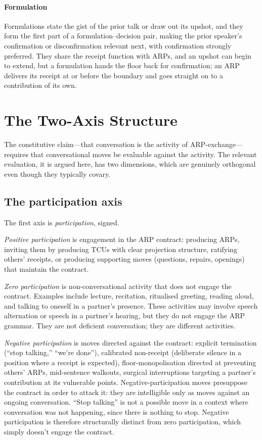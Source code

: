 \paragraph{Formulation} Formulations \citep{HeritageWatson1979} state the gist of the prior talk or draw out its upshot, and they form the first part of a formulation--decision pair, making the prior speaker's confirmation or disconfirmation relevant next, with confirmation strongly preferred. They share the receipt function with ARPs, and an upshot can begin to extend, but a formulation hands the floor back for confirmation; an ARP delivers its receipt at or before the boundary and goes straight on to a contribution of its own.

\section{The Two-Axis Structure}\label{sec:plane}

The constitutive claim---that conversation is the activity of ARP-exchange---requires that conversational moves be evaluable against the activity. The relevant evaluation, it is argued here, has two dimensions, which are genuinely orthogonal even though they typically covary.

\subsection{The participation axis}

The first axis is \emph{participation}, signed.

\emph{Positive participation} is engagement in the ARP contract: producing ARPs, inviting them by producing TCUs with clear projection structure, ratifying others' receipts, or producing supporting moves (questions, repairs, openings) that maintain the contract.

\emph{Zero participation} is non-conversational activity that does not engage the contract. Examples include lecture, recitation, ritualised greeting, reading aloud, and talking to oneself in a partner's presence. These activities may involve speech alternation or speech in a partner's hearing, but they do not engage the ARP grammar. They are not deficient conversation; they are different activities.

\emph{Negative participation} is moves directed against the contract: explicit termination (``stop talking,'' ``we're done''), calibrated non-receipt (deliberate silence in a position where a receipt is expected), floor-monopolisation directed at preventing others' ARPs, mid-sentence walkouts, surgical interruptions targeting a partner's contribution at its vulnerable points. Negative-participation moves presuppose the contract in order to attack it: they are intelligible only as moves against an ongoing conversation. ``Stop talking'' is not a possible move in a context where conversation was not happening, since there is nothing to stop. Negative participation is therefore structurally distinct from zero participation, which simply doesn't engage the contract.


